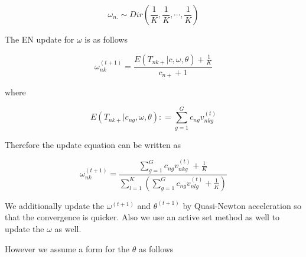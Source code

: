 \documentclass[a4paper, 12pt]{article}
\begin{document}
$$ \omega_{n.} \sim Dir \left (\frac{1}{K}, \frac{1}{K}, \cdots, \frac{1}{K} \right)  $$

The EN update for $\omega$ is as follows 

$$ \omega^{(t+1)}_{nk} =  \frac{E \left ( T_{nk+} | c, \omega, \theta \right) + \frac{1}{K}}{c_{n+} + 1} $$

where 

$$  E \left ( T_{nk+} | c_{ng}, \omega, \theta \right) : = \sum_{g=1}^{G} c_{ng} v^{(t)}_{nkg} $$

Therefore the update equation can be written as 

$$   \omega^{(t+1)}_{nk} =  \frac{\sum_{g=1}^{G} c_{ng} v^{(t)}_{nkg} + \frac{1}{K}}{\sum_{l=1}^{K} \left( \sum_{g=1}^{G} c_{ng} v^{(t)}_{nlg} + \frac{1}{K} \right ) } $$

We additionally update the $\omega^{(t+1)}$ and $\theta^{(t+1)}$ by Quasi-Newton acceleration so that the convergence is quicker. Also we use an active set method as well to update the $\omega$  as well. 

However we assume a form for the $\theta$ as follows 
\end{document}
